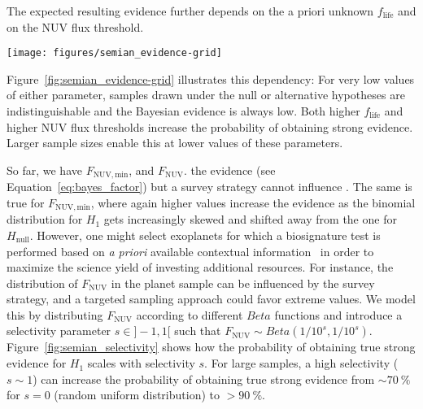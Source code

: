 \documentclass[twocolumn,twocolappendix,linenumbers]{aastex631}
\begin{document}
The expected resulting evidence further depends on the a priori unknown  $f_\mathrm{life}$ and on the \gls{NUV} flux threshold.
\begin{figure*}
    \begin{centering}
        \texttt{[image: figures/semian\_evidence-grid]}
        \caption{Probability of obtaining true strong evidence for different abiogenesis rates, \gls{NUV} flux thresholds, and sample sizes. For each of these parameters, higher values increase the probability of yielding strong evidence.}
        \label{fig:semian_evidence-grid}
    \end{centering}
\end{figure*}
Figure~\ref{fig:semian_evidence-grid} illustrates this dependency: For very low values of either parameter, samples drawn under the null or alternative hypotheses are indistinguishable and the Bayesian evidence is always low.
Both higher $f_\mathrm{life}$ and higher \gls{NUV} flux thresholds increase the probability of obtaining strong evidence.
Larger sample sizes enable this at lower values of these parameters.


So far, we have  $F_\mathrm{NUV, min}$, and $F_\mathrm{NUV}$. %
 the evidence (see Equation~\ref{eq:bayes_factor}) but a survey strategy cannot influence .
The same is true for $F_\mathrm{NUV, min}$, where again higher values increase the evidence as the binomial distribution for $H_\mathrm{1}$ gets increasingly skewed and shifted away from the one for $H_\mathrm{null}$.
However, one might select exoplanets for which a biosignature test is performed based on \textit{a priori} available contextual information~\citep{catling2018exoplanet} in order to maximize the science yield of investing additional resources.
For instance, the distribution of $F_\mathrm{NUV}$ in the planet sample can be influenced by the survey strategy, and a targeted sampling approach could favor extreme values. %
We model this by distributing $F_\mathrm{NUV}$ according to different $Beta$ functions and introduce a selectivity parameter $s\in]-1,1[$ such that $F_\mathrm{NUV} \sim Beta(1/10^s,1/10^s)$.
Figure~\ref{fig:semian_selectivity} shows how the probability of obtaining true strong evidence for $H_\mathrm{1}$ scales with selectivity $s$.
For large samples, a high selectivity ($s \sim 1$) can increase the probability of obtaining true strong evidence from $\sim \SI{70}{\percent}$ for $s= 0$ (random uniform distribution) to $> \SI{90}{\percent}$.
\end{document}
